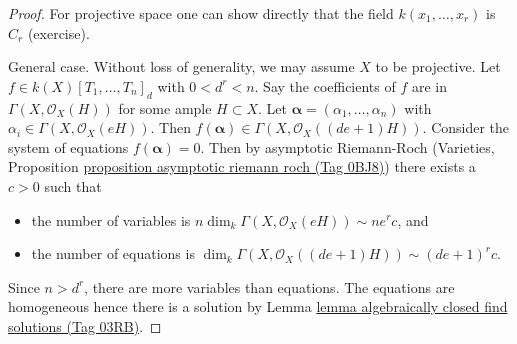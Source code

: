 \documentclass{amsart}
\theoremstyle{plain}
\theoremstyle{definition}
\theoremstyle{remark}
\numberwithin{equation}{subsection}
\begin{document}
\begin{proof}
For projective space one can show directly that the field
$k(x_1, \ldots, x_r)$ is $C_r$ (exercise).

\medskip\noindent
General case. Without loss of generality, we may assume $X$ to be projective.
Let $f \in k(X)[T_1, \ldots, T_n]_d$ with $0 < d^r < n$.
Say the coefficients of $f$ are in $\Gamma(X, \mathcal{O}_X(H))$
for some ample $H \subset X$. Let
$\mathbf{\alpha} = (\alpha_1, \ldots, \alpha_n)$ with $\alpha_i \in \Gamma(X,
\mathcal{O}_X(eH))$. Then $f(\mathbf{\alpha}) \in \Gamma(X,
\mathcal{O}_X((de + 1)H))$. Consider the system of equations $f(\mathbf{\alpha})
=0$. Then by asymptotic Riemann-Roch
(Varieties, Proposition \href{https://stacks.math.columbia.edu/tag/0BJ8}{proposition asymptotic riemann roch (Tag 0BJ8)})
there exists a $c > 0$ such that
\begin{itemize}
\item the number of variables is
$n\dim_k \Gamma(X, \mathcal{O}_X(eH)) \sim n e^r c$, and
\item the number of equations is
$\dim_k \Gamma(X, \mathcal{O}_X((de + 1)H)) \sim (de + 1)^r c$.
\end{itemize}
Since $n > d^r$, there are more variables than equations. The equations are
homogeneous hence there is a solution by
Lemma \href{https://stacks.math.columbia.edu/tag/03RB}{lemma algebraically closed find solutions (Tag 03RB)}.
\end{proof}
\end{document}
